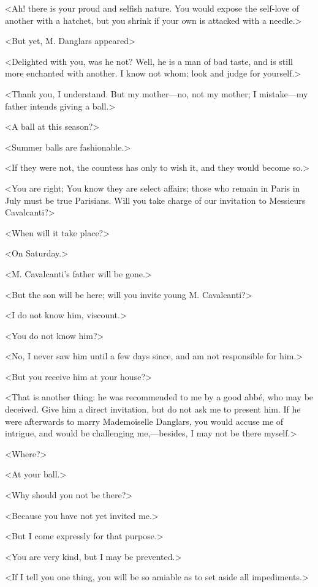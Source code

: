  <Ah! there is your proud and selfish nature. You would expose the self-love of another with a hatchet, but you shrink if your own is attacked with a needle.> 

 <But yet, M. Danglars appeared\longdash> 

 <Delighted with you, was he not? Well, he is a man of bad taste, and is still more enchanted with another. I know not whom; look and judge for yourself.> 

 <Thank you, I understand. But my mother—no, not my mother; I mistake—my father intends giving a ball.> 

 <A ball at this season?> 

 <Summer balls are fashionable.> 

 <If they were not, the countess has only to wish it, and they would become so.> 

 <You are right; You know they are select affairs; those who remain in Paris in July must be true Parisians. Will you take charge of our invitation to Messieurs Cavalcanti?> 

 <When will it take place?> 

 <On Saturday.> 

 <M. Cavalcanti's father will be gone.> 

 <But the son will be here; will you invite young M. Cavalcanti?> 

 <I do not know him, viscount.> 

 <You do not know him?> 

 <No, I never saw him until a few days since, and am not responsible for him.> 

 <But you receive him at your house?> 

 <That is another thing: he was recommended to me by a good abbé, who may be deceived. Give him a direct invitation, but do not ask me to present him. If he were afterwards to marry Mademoiselle Danglars, you would accuse me of intrigue, and would be challenging me,—besides, I may not be there myself.> 

 <Where?> 

 <At your ball.> 

 <Why should you not be there?> 

 <Because you have not yet invited me.> 

 <But I come expressly for that purpose.> 

 <You are very kind, but I may be prevented.> 

 <If I tell you one thing, you will be so amiable as to set aside all impediments.> 

